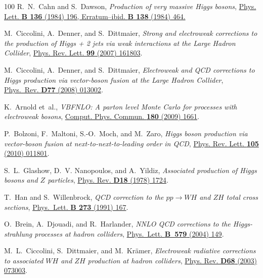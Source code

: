 \documentclass[final,3p,times,twocolumn]{elsarticle}
\begin{document}
\begin{thebibliography}{100}
R.~N.~Cahn and S.~Dawson, {\em {Production of very massive Higgs bosons}},
  \href{http://dx.doi.org/10.1016/0370-2693(84)91180-8}{Phys. Lett. {\bfseries
  B 136} (1984) 196, Erratum--ibid. {\bf B 138} (1984) 464.}

M.~Ciccolini, A.~Denner, and S.~Dittmaier, {\em {Strong and electroweak
  corrections to the production of Higgs + 2 jets via weak interactions at the
  Large Hadron Collider}}, \href{http://dx.doi.org/10.1103/PhysRevLett.99.161803}{Phys. Rev.
  Lett. {\bfseries 99} (2007) 161803}.

M.~Ciccolini, A.~Denner, and S.~Dittmaier, {\em {Electroweak and QCD
  corrections to Higgs production via vector-boson fusion at the Large Hadron Collider}},
  \href{http://dx.doi.org/10.1103/PhysRevD.77.013002}{Phys.~Rev. {\bfseries
  D77} (2008) 013002}.

K.~Arnold {et~al.}, {\em
  {VBFNLO: A parton level Monte Carlo for processes with electroweak bosons}},
  \href{http://dx.doi.org/10.1016/j.cpc.2009.03.006}{Comput. Phys. Commun.
  {\bfseries 180} (2009) 1661}.

{P.~Bolzoni, F.~Maltoni, S.-O.~Moch, and M.~Zaro}, {\em {Higgs boson production via
  vector-boson fusion at next-to-next-to-leading order in QCD}},
  \href{http://dx.doi.org/10.1103/PhysRevLett.105.011801}{Phys. Rev. Lett.
  {\bfseries 105} (2010) 011801}.

S.~L.~Glashow, D.~V. Nanopoulos, and A.~Yildiz, {\em {Associated production of
  Higgs bosons and $Z$ particles}},
  \href{http://dx.doi.org/10.1103/PhysRevD.18.1724}{Phys. Rev. {\bfseries D18}
  (1978) 1724}.

T.~Han and S.~Willenbrock, {\em {QCD correction to the $pp \rightarrow WH$ and
  $ZH$ total cross sections}},
  \href{http://dx.doi.org/10.1016/0370-2693(91)90572-8}{Phys.~Lett. {\bfseries
  B 273} (1991) 167}.

{O.~Brein, A.~Djouadi, and R.~Harlander}, {\em {NNLO QCD corrections to the
  Higgs-strahlung processes at hadron colliders}},
  \href{http://dx.doi.org/10.1016/j.physletb.2003.10.112}{Phys.~Lett.
  {\bfseries B~579} (2004) 149}.

{M.~L.~Ciccolini, S.~Dittmaier, and M.~Kr{\"a}mer}, {\em {Electroweak radiative
  corrections to associated $WH$ and $ZH$ production at hadron colliders}},
  \href{http://dx.doi.org/10.1103/PhysRevD.68.073003}{Phys. Rev. {\bfseries
  D68} (2003) 073003}.


\end{thebibliography}
\end{document}
